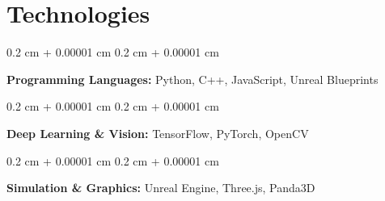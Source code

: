 \documentclass[10pt, letterpaper]{article}
\newenvironment{onecolentry}{
    \begin{adjustwidth}{
        0.2 cm + 0.00001 cm
    }{
        0.2 cm + 0.00001 cm
    }
}{
    \end{adjustwidth}
} %
\begin{document}


    \section{Technologies}

        \begin{onecolentry}
            \textbf{Programming Languages:} Python, C++, JavaScript, Unreal Blueprints
        \end{onecolentry}
    
        \vspace{0.2 cm}
    
        \begin{onecolentry}
            \textbf{Deep Learning \& Vision:} TensorFlow, PyTorch, OpenCV
        \end{onecolentry}
        
        \vspace{0.2 cm}
    
        \begin{onecolentry}
            \textbf{Simulation \& Graphics:} Unreal Engine, Three.js, Panda3D
        \end{onecolentry}


        
\end{document}

